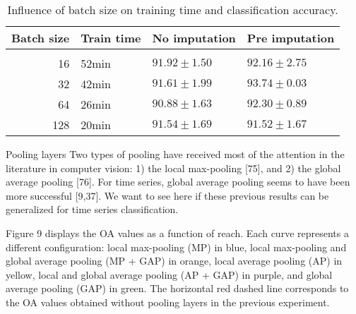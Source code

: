 \begin{table}[!htbp]
  \centering
   \begin{tabular}{rlll}
   Batch size                 & Train time  & No imputation         & Pre imputation             \\[0.2cm]
   \hline \\[-0.2cm]
    16        & 52min  	 & $91.92 \pm 1.50$ 	 & $92.16 \pm 2.75$\\
    32        & 42min  	 & $\mathbf{91.61 \pm 1.99}$ 	 & $\mathbf{93.74 \pm 0.03}$\\
    64        & 26min  	 & $90.88 \pm 1.63$ 	 & $92.30 \pm 0.89$\\
    128       & 20min  	 & $91.54 \pm 1.69$ 	 & $91.52 \pm 1.67$\\
   \end{tabular}
   \caption{Influence of batch size on training time and classification accuracy.}
   \label{tab:temCNNbatchsize}
 \end{table}
 
\begin{paragraph}{Pooling layers}
Two types of pooling have received most of the attention in the literature in computer vision:
1) the local max-pooling [75], and 2) the global average pooling [76]. For time series, global average
pooling seems to have been more successful [9,37]. We want to see here if these previous results can be
generalized for time series classification.
\end{paragraph}


Figure 9 displays the OA values as a function of reach. Each curve represents a different
configuration: local max-pooling (MP) in blue, local max-pooling and global average pooling
(MP + GAP) in orange, local average pooling (AP) in yellow, local and global average pooling
(AP + GAP) in purple, and global average pooling (GAP) in green. The horizontal red dashed
line corresponds to the OA values obtained without pooling layers in the previous experiment.



